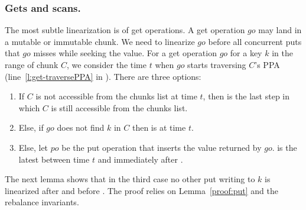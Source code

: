 \subsubsection{Gets and scans.}
\label{ssec:get-proof}

The most subtle linearization is of get operations.
A get operation $go$ may land in a mutable or immutable chunk. 
We need to linearize $go$ before all concurrent puts that $go$ misses while seeking the value.
For a get operation $go$ for a key $k$ in the range of chunk $C$, we consider the time $t$ when $go$ starts traversing $C$'s PPA (line~\ref{l:get-traversePPA} in ). There are three options:
\begin{enumerate}
\setlength{\itemsep}{0pt}
\setlength{\parskip}{0pt}
\item If $C$ is not accessible from the chunks list at time $t$, then  is the last step in which $C$ is still accessible from the chunks list.
\item Else, if $go$ does not find $k$ in $C$ then  is at time $t$.
\item Else, let $po$ be the put operation that inserts the value returned by $go$.  is the latest between time $t$ and immediately after .
\end{enumerate}


The next lemma shows that in the third case no other put writing to $k$ is linearized after  and before .
The proof relies on 
Lemma~\ref{proof:put} and the rebalance invariants.

